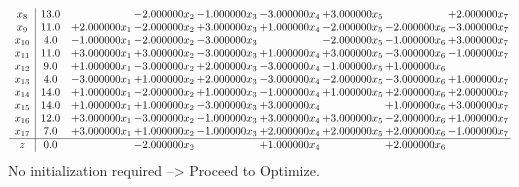 \documentclass[10pt]{article}
\begin{document}
\[\begin{array}{c| c c@{\hskip 2pt} c@{\hskip 2pt} c@{\hskip 2pt} c@{\hskip 2pt} c@{\hskip 2pt} c@{\hskip 2pt} c@{\hskip 2pt} }
 x_{8}   &  13.0  &   & -2.000000 x_{2} & -1.000000 x_{3} & -3.000000 x_{4} & + 3.000000 x_{5} &   & + 2.000000 x_{7}\\
 x_{9}   &  11.0 & + 2.000000 x_{1} & -2.000000 x_{2} & + 3.000000 x_{3} & + 1.000000 x_{4} & -2.000000 x_{5} & -2.000000 x_{6} & -3.000000 x_{7}\\
 x_{10}   &  4.0 & -1.000000 x_{1} & -2.000000 x_{2} & -3.000000 x_{3} &   & -2.000000 x_{5} & -1.000000 x_{6} & + 3.000000 x_{7}\\
 x_{11}   &  11.0 & + 3.000000 x_{1} & + 3.000000 x_{2} & -3.000000 x_{3} & + 1.000000 x_{4} & + 3.000000 x_{5} & -3.000000 x_{6} & -1.000000 x_{7}\\
 x_{12}   &  9.0 & + 1.000000 x_{1} & -3.000000 x_{2} & + 2.000000 x_{3} & -3.000000 x_{4} & -1.000000 x_{5} & + 1.000000 x_{6} &   \\
 x_{13}   &  4.0 & -3.000000 x_{1} & + 1.000000 x_{2} & + 2.000000 x_{3} & -3.000000 x_{4} & -2.000000 x_{5} & -3.000000 x_{6} & + 1.000000 x_{7}\\
 x_{14}   &  14.0 & + 1.000000 x_{1} & -2.000000 x_{2} & + 1.000000 x_{3} & -1.000000 x_{4} & + 1.000000 x_{5} & + 2.000000 x_{6} & + 2.000000 x_{7}\\
 x_{15}   &  14.0 & + 1.000000 x_{1} & + 1.000000 x_{2} & -3.000000 x_{3} & + 3.000000 x_{4} &   & + 1.000000 x_{6} & + 3.000000 x_{7}\\
 x_{16}   &  12.0 & + 3.000000 x_{1} & -3.000000 x_{2} & -1.000000 x_{3} & + 3.000000 x_{4} & + 3.000000 x_{5} & -2.000000 x_{6} & + 1.000000 x_{7}\\
 x_{17}   &  7.0 & + 3.000000 x_{1} & + 1.000000 x_{2} & -1.000000 x_{3} & + 2.000000 x_{4} & + 2.000000 x_{5} & + 2.000000 x_{6} & -1.000000 x_{7}\\
\hline
z    &  0.0  &   & -2.000000 x_{2} &   & + 1.000000 x_{4} &   & + 2.000000 x_{6} &   \\
\end{array}\]
No initialization required --> Proceed to Optimize. 
\end{document}
